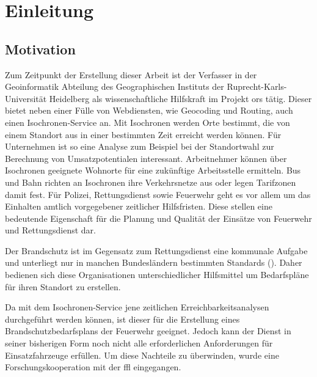 \documentclass[12pt,a4paper]{article}
\begin{document}
\newpage
\tableofcontents

\newpage
\listoffigures

\newpage
\listoftables

\printglossary[type=\acronymtype, title=Abkürzungsverzeichnis, toctitle=Abkürzungsverzeichnis]

\newpage
{}
\section{Einleitung}

\subsection{Motivation}
Zum Zeitpunkt der Erstellung dieser Arbeit ist der Verfasser in der Geoinformatik Abteilung des Geographischen Instituts der Ruprecht-Karls-Universität Heidelberg als wissenschaftliche Hilfskraft im Projekt \gls{ors} tätig. Dieser bietet neben einer Fülle von Webdiensten, wie Geocoding und Routing, auch einen Isochronen-Service an.
Mit Isochronen werden Orte bestimmt, die von einem Standort aus in einer bestimmten Zeit erreicht werden können. Für Unternehmen ist so eine Analyse zum Beispiel bei der Standortwahl zur Berechnung von Umsatzpotentialen interessant.
Arbeitnehmer können über Isochronen geeignete Wohnorte für eine zukünftige Arbeitsstelle ermitteln. Bus und Bahn richten an Isochronen ihre Verkehrsnetze aus oder legen Tarifzonen damit fest.
Für Polizei, Rettungsdienst sowie Feuerwehr geht es vor allem um das Einhalten amtlich vorgegebener zeitlicher Hilfsfristen. Diese stellen eine bedeutende Eigenschaft für die Planung und Qualität der Einsätze von Feuerwehr und Rettungsdienst dar.\par
Der Brandschutz ist im Gegensatz zum Rettungsdienst eine kommunale Aufgabe und unterliegt nur in manchen Bundesländern bestimmten Standards (\cite{bedarfsplan}). Daher bedienen sich diese Organisationen unterschiedlicher Hilfsmittel um Bedarfspläne für ihren Standort zu erstellen.
\medskip

Da mit dem Isochronen-Service jene zeitlichen Erreichbarkeitsanalysen durchgeführt werden können, ist dieser für die Erstellung eines Brandschutzbedarfsplans der Feuerwehr geeignet. Jedoch kann der Dienst in seiner bisherigen Form noch nicht alle erforderlichen Anforderungen für Einsatzfahrzeuge erfüllen. Um diese Nachteile zu überwinden, wurde eine Forschungskooperation mit der \gls{ffl} eingegangen.
\vspace{1.2cm}
\end{document}
